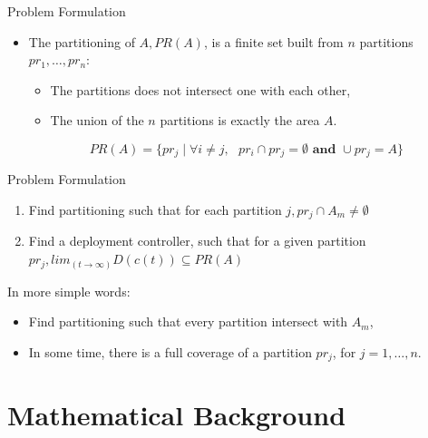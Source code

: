 \documentclass[t]{beamer}
\begin{document}
\begin{frame}[label=probformulation2]{Problem Formulation}
\begin{itemize}
\item The partitioning of $A, PR\left( A \right)$, is a finite set built from $n$ partitions $pr_{1},\ldots,pr_n$:
\begin{itemize}
\item The partitions does not intersect one with each other,
\item The union of the $n$ partitions is exactly the area $A$.
\end{itemize}
\begin{equation*}
PR\left( A \right) = \{ pr_{j} \mid \forall i \neq j,\textbf{ } pr_{i}\cap pr_{j} = \emptyset \textbf{ and }\cup pr_{j} = A \}
\end{equation*}
\end{itemize}
\end{frame}
\begin{frame}[label=probformulation2]{Problem Formulation}
\begin{problem} \label{GeneralProblem}
\begin{enumerate}
\item Find partitioning such that for each partition $j, pr_{j} \cap A_m \neq \emptyset$ 
\item Find a deployment controller, such that for a given partition $pr_j, lim_{(t\rightarrow \infty)}D(c(t)) \subseteq PR(A)$
\end{enumerate}
\end{problem}
\pause
In more simple words:
\begin{itemize}
\item Find partitioning such that every partition intersect with $A_m$,
\item In some time, there is a full coverage of a partition $pr_j$, for $j=1,\ldots, n$.
\end{itemize}
\end{frame}


\section[Mathematical Background]{Mathematical Background}
\end{document}
